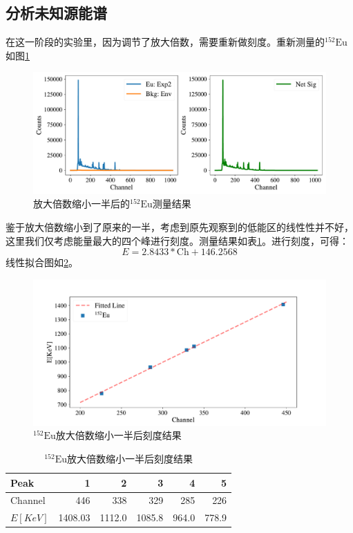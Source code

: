 \documentclass{article}
\begin{document}
    \subsection{分析未知源能谱}
    在这一阶段的实验里，因为调节了放大倍数，需要重新做刻度。重新测量的$^{152}\text{Eu}$如图\ref{fig:152Eu_Half}
    \begin{figure}[htbp]
        \centering
        \includegraphics[width=\textwidth]{../plots/Eu_half_net.pdf}
        \caption{放大倍数缩小一半后的$^{152}\text{Eu}$测量结果\label{fig:152Eu_Half}}
    \end{figure}
    鉴于放大倍数缩小到了原来的一半，考虑到原先观察到的低能区的线性性并不好，这里我们仅考虑能量最大的四个峰进行刻度。测量结果如表\ref{tab:152Eu_half}。进行刻度，可得：\begin{equation}
        E = 2.8433*\text{Ch} + 146.2568
    \end{equation}
    线性拟合图如\ref{fig:Half_fit}。
    \begin{figure}
        \centering
        \includegraphics[width=\textwidth]{../plots/Half_fit.pdf}
        \caption{$^{152}\text{Eu}$放大倍数缩小一半后刻度结果\label{fig:Half_fit}}
    \end{figure}
    \begin{table}[htbp]
        \centering
        \caption{$^{152}\text{Eu}$放大倍数缩小一半后刻度结果\label{tab:152Eu_half}}
        \begin{tabular}{lrrrrr}
\toprule
Peak    &       1 &       2 &      3 &      4 &      5 \\
\midrule
Channel &   446 &   338 &   329&  285 &  226 \\
$E[\si{KeV}]$       &  1408.03 &  1112.0 &  1085.8 &  964.0 &  778.9 \\
\bottomrule
\end{tabular}
    \end{table}
\end{document}
